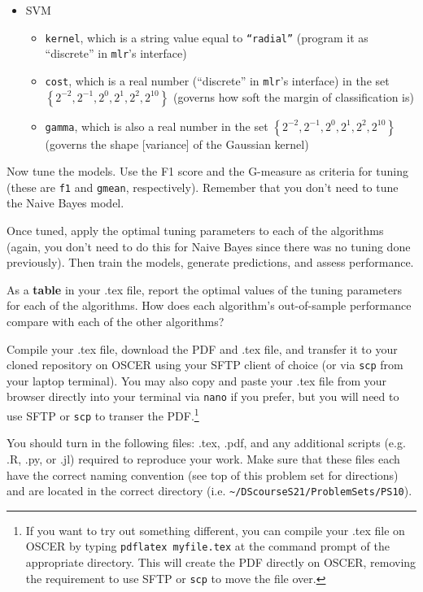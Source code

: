 \documentclass[12pt,english]{exam}
\begin{document}
\begin{questions}
\begin{itemize}
\begin{itemize}
    \end{itemize}
\item SVM
    \begin{itemize}
    \item \texttt{kernel}, which is a string value equal to \texttt{``radial''} (program it as ``discrete'' in \texttt{mlr}'s interface)
    \item \texttt{cost}, which is a real number (``discrete'' in \texttt{mlr}'s interface) in the set $\left\{2^{-2},2^{-1},2^{0},2^{1},2^{2},2^{10}\right\}$ (governs how soft the margin of classification is)
    \item \texttt{gamma}, which is also a real number in the set $\left\{2^{-2},2^{-1},2^{0},2^{1},2^{2},2^{10}\right\}$ (governs the shape [variance] of the Gaussian kernel) 
    \end{itemize}
\end{itemize}


\question Now tune the models. Use the F1 score and the G-measure as criteria for tuning (these are \texttt{f1} and \texttt{gmean}, respectively). Remember that you don't need to tune the Naive Bayes model.

\question Once tuned, apply the optimal tuning parameters to each of the algorithms (again, you don't need to do this for Naive Bayes since there was no tuning done previously). Then train the models, generate predictions, and assess performance.

\question As a \textbf{table} in your .tex file, report the optimal values of the tuning parameters for each of the algorithms. How does each algorithm's out-of-sample performance compare with each of the other algorithms?

\question Compile your .tex file, download the PDF and .tex file, and transfer it to your cloned repository on OSCER using your SFTP client of choice (or via \texttt{scp} from your laptop terminal). You may also copy and paste your .tex file from your browser directly into your terminal via \texttt{nano} if you prefer, but you will need to use SFTP or \texttt{scp} to transer the PDF.\footnote{If you want to try out something different, you can compile your .tex file on OSCER by typing \texttt{pdflatex myfile.tex} at the command prompt of the appropriate directory. This will create the PDF directly on OSCER, removing the requirement to use SFTP or \texttt{scp} to move the file over.}

\question You should turn in the following files: .tex, .pdf, and any additional scripts (e.g. .R, .py, or .jl) required to reproduce your work.  Make sure that these files each have the correct naming convention (see top of this problem set for directions) and are located in the correct directory (i.e. \texttt{\textasciitilde/DScourseS21/ProblemSets/PS10}).


\end{questions}
\end{document}
